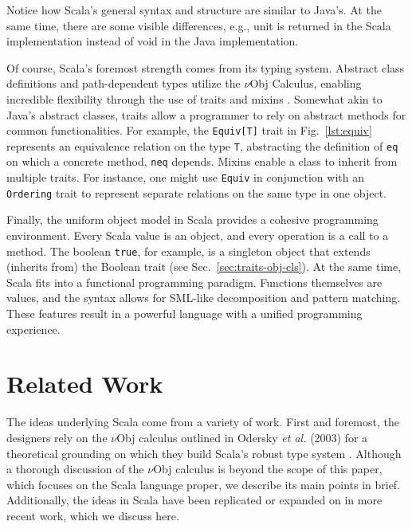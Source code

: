 \documentclass[jou,apacite]{IEEEtran}
\begin{document}
\begin{listing}
  \centering
  \inputminted[frame=single]{Java}{../examples/PrintExample.java}
  \inputminted[frame=single]{Scala}{../examples/PrintExample.scala}
  \caption{Notice how Scala's general syntax and structure are similar
    to Java's. At the same time, there are some visible differences, e.g., unit
    is returned in the Scala implementation instead of void in the Java
    implementation.}
  \label{lst:print}
\end{listing}

Of course, Scala's foremost strength comes from its typing system. Abstract
class definitions and path-dependent types utilize the $\nu$Obj Calculus,
enabling incredible flexibility through the use of traits and mixins
\cite{odersky_nominal_2003}. Somewhat akin to Java's abstract classes, traits
allow a programmer to rely on abstract methods for common functionalities. For
example, the \texttt{Equiv[T]} trait in Fig.~\ref{lst:equiv} represents an
equivalence relation on the type \texttt{T}, abstracting the definition of
\texttt{eq} on which a concrete method, \texttt{neq} depends. Mixins enable a
class to inherit from multiple traits. For instance, one might use
\texttt{Equiv} in conjunction with an \texttt{Ordering} trait to represent
separate relations on the same type in one object.

Finally, the uniform object model in Scala provides a cohesive programming
environment. Every Scala value is an object, and every operation is a call to a
method. The boolean \texttt{true}, for example, is a singleton object that
extends (inherits from) the Boolean trait (see
Sec.~\ref{sec:traits-obj-cls}). At the same time, Scala fits into a functional
programming paradigm. Functions themselves are values, and the syntax allows for
SML-like decomposition and pattern matching. These features result in a powerful
language with a unified programming experience.

\section{Related Work}
\label{sec:related-work}

The ideas underlying Scala come from a variety of work. First and foremost, the
designers rely on the $\nu$Obj calculus outlined in Odersky \emph{et al.}
(2003) for a theoretical grounding on which they build Scala's robust type
system \cite{odersky_nominal_2003}. Although a thorough discussion of the
$\nu$Obj calculus is beyond the scope of this paper, which focuses on the Scala
language proper, we describe its main points in brief. Additionally, the ideas
in Scala have been replicated or expanded on in more recent work, which we
discuss here.
\end{document}
